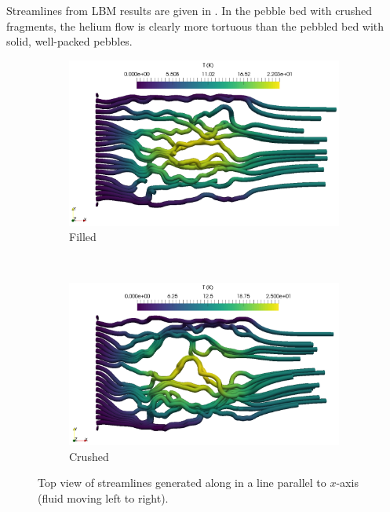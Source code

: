 Streamlines from LBM results are given in . In the pebble bed with crushed fragments, the helium flow is clearly more tortuous than the pebbled bed with solid, well-packed pebbles.
\begin{figure}[!ht]
    \centering
    \begin{subfigure}[b]{0.44\textwidth}
        \includegraphics[width = \textwidth]{figures/lbm/temperature-streamlines-filled-z-normal}
        \caption{Filled}\label{fig:streamlines-filled-z}
    \end{subfigure}
    ~
    \begin{subfigure}[b]{0.44\textwidth}
        \includegraphics[width = \textwidth]{figures/lbm/temperature-streamlines-crushed-z-normal}
        \caption{Crushed}\label{fig:streamlines-crushed-z}
    \end{subfigure}
    \caption{Top view of streamlines generated along in a line parallel to $x$-axis (fluid moving left to right).}\label{fig:streamlines-z}
\end{figure}

